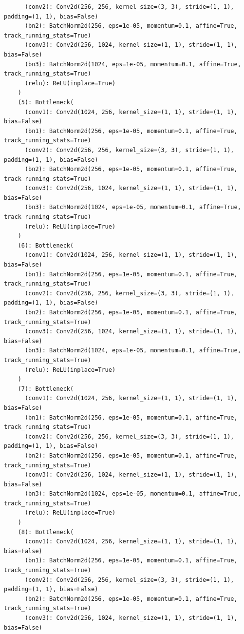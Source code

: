 \documentclass{article}
\begin{document}
\begin{verbatim}
      (conv2): Conv2d(256, 256, kernel_size=(3, 3), stride=(1, 1), padding=(1, 1), bias=False)
      (bn2): BatchNorm2d(256, eps=1e-05, momentum=0.1, affine=True, track_running_stats=True)
      (conv3): Conv2d(256, 1024, kernel_size=(1, 1), stride=(1, 1), bias=False)
      (bn3): BatchNorm2d(1024, eps=1e-05, momentum=0.1, affine=True, track_running_stats=True)
      (relu): ReLU(inplace=True)
    )
    (5): Bottleneck(
      (conv1): Conv2d(1024, 256, kernel_size=(1, 1), stride=(1, 1), bias=False)
      (bn1): BatchNorm2d(256, eps=1e-05, momentum=0.1, affine=True, track_running_stats=True)
      (conv2): Conv2d(256, 256, kernel_size=(3, 3), stride=(1, 1), padding=(1, 1), bias=False)
      (bn2): BatchNorm2d(256, eps=1e-05, momentum=0.1, affine=True, track_running_stats=True)
      (conv3): Conv2d(256, 1024, kernel_size=(1, 1), stride=(1, 1), bias=False)
      (bn3): BatchNorm2d(1024, eps=1e-05, momentum=0.1, affine=True, track_running_stats=True)
      (relu): ReLU(inplace=True)
    )
    (6): Bottleneck(
      (conv1): Conv2d(1024, 256, kernel_size=(1, 1), stride=(1, 1), bias=False)
      (bn1): BatchNorm2d(256, eps=1e-05, momentum=0.1, affine=True, track_running_stats=True)
      (conv2): Conv2d(256, 256, kernel_size=(3, 3), stride=(1, 1), padding=(1, 1), bias=False)
      (bn2): BatchNorm2d(256, eps=1e-05, momentum=0.1, affine=True, track_running_stats=True)
      (conv3): Conv2d(256, 1024, kernel_size=(1, 1), stride=(1, 1), bias=False)
      (bn3): BatchNorm2d(1024, eps=1e-05, momentum=0.1, affine=True, track_running_stats=True)
      (relu): ReLU(inplace=True)
    )
    (7): Bottleneck(
      (conv1): Conv2d(1024, 256, kernel_size=(1, 1), stride=(1, 1), bias=False)
      (bn1): BatchNorm2d(256, eps=1e-05, momentum=0.1, affine=True, track_running_stats=True)
      (conv2): Conv2d(256, 256, kernel_size=(3, 3), stride=(1, 1), padding=(1, 1), bias=False)
      (bn2): BatchNorm2d(256, eps=1e-05, momentum=0.1, affine=True, track_running_stats=True)
      (conv3): Conv2d(256, 1024, kernel_size=(1, 1), stride=(1, 1), bias=False)
      (bn3): BatchNorm2d(1024, eps=1e-05, momentum=0.1, affine=True, track_running_stats=True)
      (relu): ReLU(inplace=True)
    )
    (8): Bottleneck(
      (conv1): Conv2d(1024, 256, kernel_size=(1, 1), stride=(1, 1), bias=False)
      (bn1): BatchNorm2d(256, eps=1e-05, momentum=0.1, affine=True, track_running_stats=True)
      (conv2): Conv2d(256, 256, kernel_size=(3, 3), stride=(1, 1), padding=(1, 1), bias=False)
      (bn2): BatchNorm2d(256, eps=1e-05, momentum=0.1, affine=True, track_running_stats=True)
      (conv3): Conv2d(256, 1024, kernel_size=(1, 1), stride=(1, 1), bias=False)

\end{verbatim}
\end{document}
